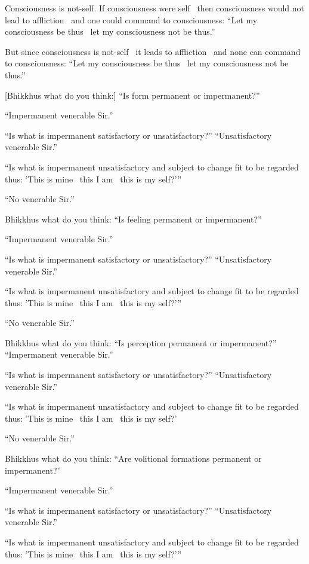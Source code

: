 Consciousness is not-self. If consciousness were self \breathmark\ then consciousness would not lead to affliction \breathmark\ and one could command to consciousness: “Let my consciousness be thus \breathmark\ let my consciousness not be thus.”

But since consciousness is not-self \breathmark\ it leads to affliction \breathmark\ and none can command to consciousness: “Let my consciousness be thus \breathmark\ let my consciousness not be thus.”

[Bhikkhus what do you think:] “Is form permanent or impermanent?”

“Impermanent venerable Sir.”

“Is what is impermanent satisfactory or unsatisfactory?” “Unsatisfactory venerable Sir.”

“Is what is impermanent unsatisfactory and subject to change fit to be regarded thus: 'This is mine \breathmark\ this I am \breathmark\ this is my self?'”

“No venerable Sir.”

Bhikkhus what do you think: “Is feeling permanent or impermanent?”

“Impermanent venerable Sir.”

“Is what is impermanent satisfactory or unsatisfactory?” “Unsatisfactory venerable Sir.”

“Is what is impermanent unsatisfactory and subject to change fit to be regarded thus: 'This is mine \breathmark\ this I am \breathmark\ this is my self?'”

“No venerable Sir.”

Bhikkhus what do you think: “Is perception permanent or impermanent?” “Impermanent venerable Sir.”

“Is what is impermanent satisfactory or unsatisfactory?” “Unsatisfactory venerable Sir.”

“Is what is impermanent unsatisfactory and subject to change fit to be regarded thus: 'This is mine \breathmark\ this I am \breathmark\ this is my self?'

“No venerable Sir.”

Bhikkhus what do you think: “Are volitional formations permanent or impermanent?”

“Impermanent venerable Sir.”

“Is what is impermanent satisfactory or unsatisfactory?” “Unsatisfactory venerable Sir.”

“Is what is impermanent unsatisfactory and subject to change fit to be regarded thus: 'This is mine \breathmark\ this I am \breathmark\ this is my self?'”

